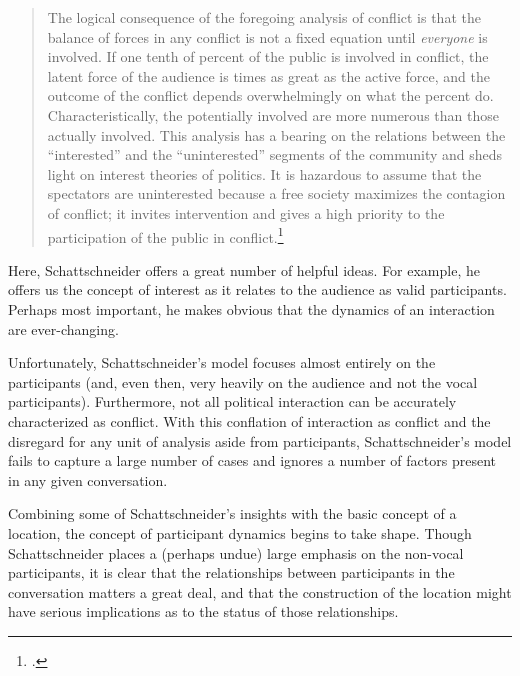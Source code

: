 \documentclass[openany,twoside]{memoir}
\begin{document}
\blockquote{The logical consequence of the foregoing analysis of conflict is that the balance of forces in any conflict is not a fixed equation until \emph{everyone} is involved. 
If one tenth of  percent of the public is involved in conflict, the latent force of the audience is  times as great as the active force, and the outcome of the conflict depends overwhelmingly on what the  percent do. 
Characteristically, the potentially involved are more numerous than those actually involved. 
This analysis has a bearing on the relations between the ``interested'' and the ``uninterested'' segments of the community and sheds light on interest theories of politics. 
It is hazardous to assume that the spectators are uninterested because a free society maximizes the contagion of conflict; it invites intervention and gives a high priority to the participation of the public in conflict.\footcite[5]{schattschneider75}}\begin{Spacing}{2}
\noindent
Here, Schattschneider offers a great number of helpful ideas. 
For example, he offers us the concept of interest as it relates to the audience as valid participants.
Perhaps most important, he makes obvious that the dynamics of an interaction are ever-changing. 

Unfortunately, Schattschneider's model focuses almost entirely on the participants (and, even then, very heavily on the audience and not the vocal participants). 
Furthermore, not all political interaction can be accurately characterized as conflict. 
With this conflation of interaction as conflict and the disregard for any unit of analysis aside from participants, Schattschneider's model fails to capture a large number of cases and ignores a number of factors present in any given conversation.

Combining some of Schattschneider's insights with the basic concept of a location, the concept of participant dynamics begins to take shape.
Though Schattschneider places a (perhaps undue) large emphasis on the non-vocal participants, it is clear that the relationships between participants in the conversation matters a great deal, and that the construction of the location might have serious implications as to the status of those relationships.


\end{Spacing}
\end{document}
